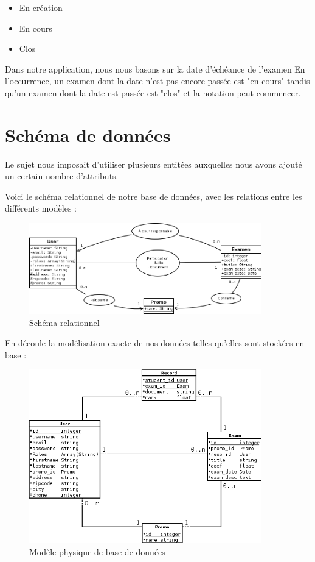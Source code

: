 \documentclass{report}
\begin{document}
        \begin{itemize}
          \item{En création}
          \item{En cours}
          \item{Clos}
        \end{itemize}

        Dans notre application, nous nous basons sur la date d'échéance de l'examen
        En l'occurrence, un examen dont la date n'est pas encore passée est "en cours"
        tandis qu'un examen dont la date est passée est "clos" et la notation peut commencer.
  	
  \chapter{Schéma de données}
    Le sujet nous imposait d'utiliser plusieurs entitées auxquelles nous avons 
    ajouté un certain nombre d'attributs.

    Voici le schéma relationnel de notre base de données, avec les relations entre les 
    différents modèles :
    \begin{figure}[!h]
      \includegraphics[width=0.9\textwidth]{./data.png}
      \caption{Schéma relationnel}
    \end{figure}

    En découle la modélisation exacte de nos données telles qu'elles sont stockées en base :
    \begin{figure}[!h]
      \includegraphics[width=0.9\textwidth]{./db.png}
      \caption{Modèle physique de base de données}
    \end{figure}
    \clearpage
\end{document}
